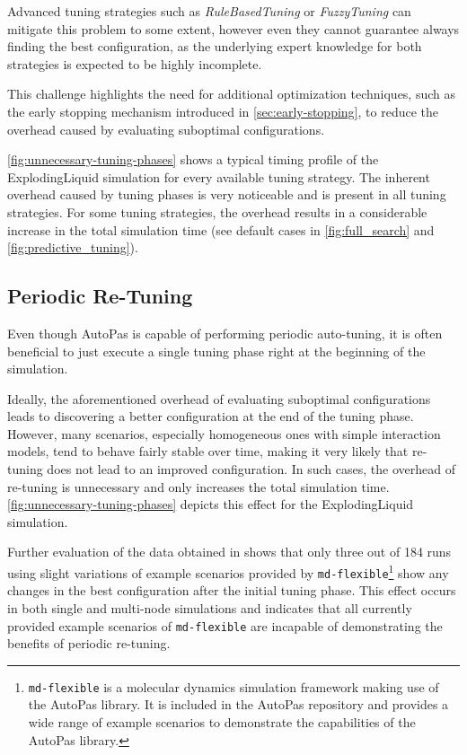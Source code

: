 \documentclass[conference]{IEEEtran}
\begin{document}
Advanced tuning strategies such as \textit{RuleBasedTuning} or \textit{FuzzyTuning} can mitigate this problem to some extent, however even they cannot guarantee always finding the best configuration, as the underlying expert knowledge for both strategies is expected to be highly incomplete.

This challenge highlights the need for additional optimization techniques, such as the early stopping mechanism introduced in \autoref{sec:early-stopping}, to reduce the overhead caused by evaluating suboptimal configurations.

\autoref{fig:unnecessary-tuning-phases} shows a typical timing profile of the ExplodingLiquid simulation for every available tuning strategy. The inherent overhead caused by tuning phases is very noticeable and is present in all tuning strategies. For some tuning strategies, the overhead results in a considerable increase in the total simulation time (see default cases in \autoref{fig:full_search} and \autoref{fig:predictive_tuning}).

\subsection*{Periodic Re-Tuning}

Even though AutoPas is capable of performing periodic auto-tuning, it is often beneficial to just execute a single tuning phase right at the beginning of the simulation.

Ideally, the aforementioned overhead of evaluating suboptimal configurations leads to discovering a better configuration at the end of the tuning phase. However, many scenarios, especially homogeneous ones with simple interaction models, tend to behave fairly stable over time, making it very likely that re-tuning does not lead to an improved configuration. In such cases, the overhead of re-tuning is unnecessary and only increases the total simulation time. \autoref{fig:unnecessary-tuning-phases} depicts this effect for the ExplodingLiquid simulation.

Further evaluation of the data obtained in \cite{lerchner2024} shows that only three out of 184 runs using slight variations of example scenarios provided by \texttt{md-flexible}\footnote{
    \texttt{md-flexible} is a molecular dynamics simulation framework making use of the AutoPas library. It is included in the AutoPas repository and provides a wide range of example scenarios to demonstrate the capabilities of the AutoPas library.
} show any changes in the best configuration after the initial tuning phase. This effect occurs in both single and multi-node simulations and indicates that all currently provided example scenarios of \texttt{md-flexible} are incapable of demonstrating the benefits of periodic re-tuning.
\end{document}
